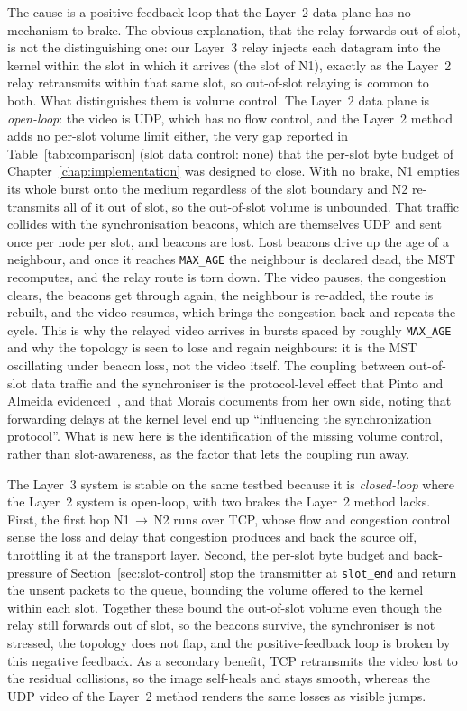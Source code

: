 The cause is a positive-feedback loop that the Layer~2 data plane has no
mechanism to brake. The obvious explanation, that the relay forwards out of
slot, is not the distinguishing one: our Layer~3 relay injects each datagram
into the kernel within the slot in which it arrives (the slot of N1), exactly as
the Layer~2 relay retransmits within that same slot, so out-of-slot relaying is
common to both. What distinguishes them is volume control. The Layer~2 data
plane is \emph{open-loop}: the video is UDP, which has no flow control, and the
Layer~2 method adds no per-slot volume limit either, the very gap reported in
Table~\ref{tab:comparison} (slot data control: none) that the per-slot byte
budget of Chapter~\ref{chap:implementation} was designed to close. With no
brake, N1 empties its whole burst onto the medium regardless of the slot
boundary and N2 re-transmits all of it out of slot, so the out-of-slot volume is
unbounded. That traffic collides with the synchronisation beacons, which are
themselves UDP and sent once per node per slot, and beacons are lost. Lost
beacons drive up the age of a neighbour, and once it reaches \texttt{MAX\_AGE}
the neighbour is declared dead, the MST recomputes, and the relay route is torn
down. The video pauses, the congestion clears, the beacons get through again,
the neighbour is re-added, the route is rebuilt, and the video resumes, which
brings the congestion back and repeats the cycle. This is why the relayed video
arrives in bursts spaced by roughly \texttt{MAX\_AGE} and why the topology is
seen to lose and regain neighbours: it is the MST oscillating under beacon loss,
not the video itself. The coupling between out-of-slot data traffic and the
synchroniser is the protocol-level effect that Pinto and Almeida
evidenced~\cite{pinto2018robust, ramos2018aerial}, and that Morais documents
from her own side, noting that forwarding delays at the kernel level end up
``influencing the synchronization protocol''. What is new here is the
identification of the missing volume control, rather than slot-awareness, as the
factor that lets the coupling run away.

The Layer~3 system is stable on the same testbed because it is \emph{closed-loop}
where the Layer~2 system is open-loop, with two brakes the Layer~2 method lacks.
First, the first hop N1\,$\to$\,N2 runs over TCP, whose flow and congestion
control sense the loss and delay that congestion produces and back the source
off, throttling it at the transport layer. Second, the per-slot byte budget and
back-pressure of Section~\ref{sec:slot-control} stop the transmitter at
\texttt{slot\_end} and return the unsent packets to the queue, bounding the
volume offered to the kernel within each slot. Together these bound the
out-of-slot volume even though the relay still forwards out of slot, so the
beacons survive, the synchroniser is not stressed, the topology does not flap,
and the positive-feedback loop is broken by this negative feedback. As a
secondary benefit, TCP retransmits the video lost to the residual collisions, so
the image self-heals and stays smooth, whereas the UDP video of the Layer~2
method renders the same losses as visible jumps.

